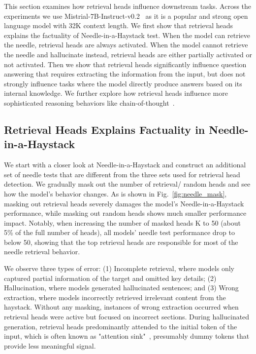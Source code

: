 
This section examines how retrieval heads influence downstream tasks. 
Across the experiments we use Mistrial-7B-Instruct-v0.2~\citep{mistralv02} as it is a popular and strong open language model with 32K context length. 
We first show that retrieval heads explains the factuality of Needle-in-a-Haystack test. 
When the model can retrieve the needle, retrieval heads are always activated. 
When the model cannot retrieve the needle and hallucinate instead, retrieval heads are either partially activated or not activated. 
Then we show that retrieval heads significantly influence question answering that requires extracting the information from the input, but does not strongly influence tasks where the model directly produce answers based on its internal knowledge.
We further explore how retrieval heads influence more sophisticated reasoning behaviors like chain-of-thought~\citep{DBLP:conf/nips/Wei0SBIXCLZ22}.



\subsection{Retrieval Heads Explains Factuality in Needle-in-a-Haystack}
We start with a closer look at Needle-in-a-Haystack and  
construct an additional set of needle tests that are different from the three sets used for retrieval head detection. 
We gradually mask out the number of retrieval/ random heads and see how the model's behavior changes. 
As is shown in Fig.~\ref{fig:needle_mask}, masking out retrieval heads severely damages the model's Needle-in-a-Haystack performance, while masking out random heads shows much smaller performance impact. 
Notably, when increasing the number of masked heads K to 50 (about 5\% of the full number of heads), all models' needle test performance drop to below 50, showing that the top retrieval heads are responsible for most of the needle retrieval behavior. 



We observe three types of error: (1) Incomplete retrieval, where models only captured partial information of the target and omitted key details; (2) Hallucination, where models generated hallucinated sentences; and (3) Wrong extraction, where models incorrectly retrieved irrelevant content from the haystack.
Without any masking, instances of wrong extraction occurred when retrieval heads were active but focused on incorrect sections. During hallucinated generation, retrieval heads predominantly attended to the initial token of the input, which is often known as "attention sink"~\citep{xiao2023efficient}, presumably dummy tokens that provide less meaningful signal.


